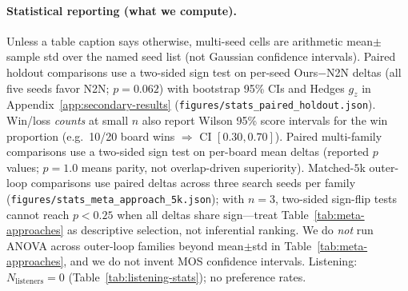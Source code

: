 \paragraph{Statistical reporting (what we compute).}
Unless a table caption says otherwise, multi-seed cells are arithmetic mean$\pm$sample std over the named seed list (not Gaussian confidence intervals).
Paired holdout comparisons use a two-sided sign test on per-seed Ours$-$N2N deltas (all five seeds favor N2N; $p{=}0.062$) with bootstrap 95\% CIs and Hedges $g_z$ in Appendix~\ref{app:secondary-results} (\texttt{figures/stats\_paired\_holdout.json}).
Win/loss \emph{counts} at small $n$ also report Wilson 95\% score intervals for the win proportion (e.g.\ 10/20 board wins $\Rightarrow$ CI $[0.30,0.70]$).
Paired multi-family comparisons use a two-sided sign test on per-board mean deltas (reported $p$ values; $p{=}1.0$ means parity, not overlap-driven superiority).
Matched-$5$k outer-loop comparisons use paired deltas across three search seeds per family (\texttt{figures/stats\_meta\_approach\_5k.json}); with $n{=}3$, two-sided sign-flip tests cannot reach $p<0.25$ when all deltas share sign---treat Table~\ref{tab:meta-approaches} as descriptive selection, not inferential ranking.
We do \emph{not} run ANOVA across outer-loop families beyond mean$\pm$std in Table~\ref{tab:meta-approaches}, and we do not invent MOS confidence intervals.
Listening: $N_{\mathrm{listeners}}{=}0$ (Table~\ref{tab:listening-stats}); no preference rates.

